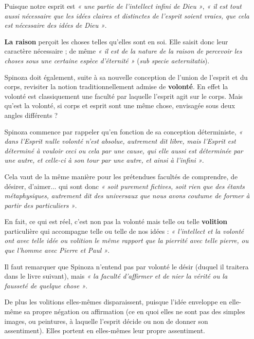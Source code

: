 Puisque notre esprit est {\it « une partie de l’intellect infini de Dieu »}, {\it « il est
tout aussi nécessaire que les idées claires et distinctes de l’esprit soient
vraies, que cela est nécessaire des idées de Dieu »}.

{\bf La raison} perçoit les choses telles qu’elles sont en soi. Elle saisit donc
leur caractère nécessaire ; de même {\it « il est de la nature de la raison de
percevoir les choses sous une certaine espèce d’éternité »} ({\it sub specie
aeternitatis}).

\vspace{0.5cm}
Spinoza doit également, suite à sa nouvelle conception de l’union de l’esprit
et du corps, revisiter la notion traditionnellement admise de {\bf volonté}. En
effet la volonté est classiquement une faculté par laquelle l’esprit agit sur
le corps. Mais qu’est la volonté, si corps et esprit sont une même chose,
envisagée sous deux angles différents ?

\vspace{0.5cm}
Spinoza commence par rappeler qu’en fonction de sa conception déterministe,
{\it « dans l’Esprit nulle volonté n’est absolue, autrement dit libre, mais l’Esprit
est déterminé à vouloir ceci ou cela par une cause, qui elle aussi est
déterminée par une autre, et celle-ci à son tour par une autre, et ainsi à
l’infini »}.

Cela vaut de la même manière pour les prétendues facultés de comprendre, de
désirer, d’aimer... qui sont donc {\it « soit purement fictives, soit rien que des
étants métaphysiques, autrement dit des universaux que nous avons coutume de
former à partir des particuliers »}.

\vspace{0.5cm}
En fait, ce qui est réel, c’est non pas la volonté mais telle ou telle {\bf volition}
particulière qui accompagne telle ou telle de nos idées : {\it « l’intellect et la
volonté ont avec telle idée ou volition le même rapport que la pierrité avec
telle pierre, ou que l’homme avec Pierre et Paul »}.

Il faut remarquer que Spinoza n’entend pas par volonté le désir (duquel il
traitera dans le livre suivant), mais {\it « la faculté d’affirmer et de nier la
vérité ou la fausseté de quelque chose »}.

\vspace{0.5cm}
De plus les volitions elles-mêmes disparaissent, puisque l’idée enveloppe en
elle-même sa propre négation ou affirmation (ce en quoi elles ne sont pas des
simples images, ou peintures, à laquelle l’esprit décide ou non de donner son
assentiment). Elles portent en elles-mêmes leur propre assentiment.

